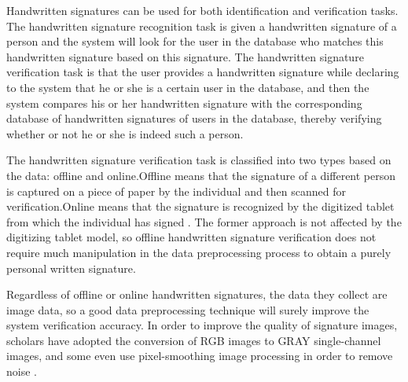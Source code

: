 \documentclass{article}
\begin{document}
Handwritten signatures can be used for both identification and verification tasks. The handwritten signature recognition task is given a handwritten signature of a person and the system will look for the user in the database who matches this handwritten signature based on this signature. The handwritten signature verification task is that the user provides a handwritten signature while declaring to the system that he or she is a certain user in the database, and then the system compares his or her handwritten signature with the corresponding database of handwritten signatures of users in the database, thereby verifying whether or not he or she is indeed such a person.

The handwritten signature verification task is classified into two types based on the data: offline and online.Offline means that the signature of a different person is captured on a piece of paper by the individual and then scanned for verification.Online means that the signature is recognized by the digitized tablet from which the individual has signed \cite{3}. The former approach is not affected by the digitizing tablet model, so offline handwritten signature verification does not require much manipulation in the data preprocessing process to obtain a purely personal written signature.

Regardless of offline or online handwritten signatures, the data they collect are image data, so a good data preprocessing technique will surely improve the system verification accuracy. In order to improve the quality of signature images, scholars have adopted the conversion of RGB images to GRAY single-channel images, and some even use pixel-smoothing image processing in order to remove noise \cite{4}.
\end{document}
